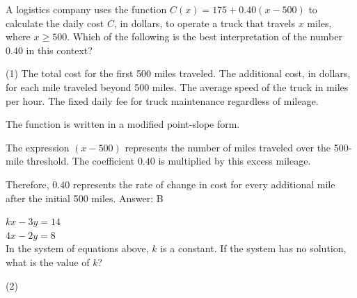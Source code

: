 \documentclass[11pt,paper=a4,answers]{exam}
\begin{document}
\begin{questions}
\vspace{1cm}

\question
A logistics company uses the function $C(x) = 175 + 0.40(x - 500)$ to calculate the daily cost $C$, in dollars, to operate a truck that travels $x$ miles, where $x \geq 500$. Which of the following is the best interpretation of the number $0.40$ in this context?
\begin{tasks}(1)
\task The total cost for the first 500 miles traveled.
\task The additional cost, in dollars, for each mile traveled beyond 500 miles.
\task The average speed of the truck in miles per hour.
\task The fixed daily fee for truck maintenance regardless of mileage.
\end{tasks}

\begin{solution}
The function is written in a modified point-slope form.
\vspace{5pt}
\begin{center}
The expression $(x - 500)$ represents the number of miles traveled over the 500-mile threshold.
\vspace{5pt}
The coefficient $0.40$ is multiplied by this excess mileage.
\end{center}
\vspace{5pt}
Therefore, $0.40$ represents the rate of change in cost for every additional mile after the initial 500 miles.
\vspace{5pt}
Answer: \colorbox{yellow!100}{B}
\end{solution}

\vspace{1cm}

\question
$kx - 3y = 14$ \\
$4x - 2y = 8$ \\
In the system of equations above, $k$ is a constant. If the system has no solution, what is the value of $k$?
\begin{tasks}(2)
   
\end{tasks}


\end{questions}
\end{document}
